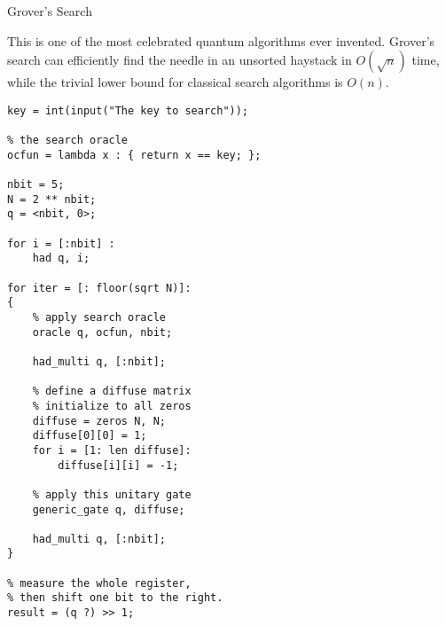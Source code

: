 \documentclass[]{article}
\begin{document}
Grover's Search

This is one of the most celebrated quantum algorithms ever invented.
Grover's search can efficiently find the needle in an unsorted haystack
in \(O(\sqrt{n})\) time, while the trivial lower bound for classical
search algorithms is \(O(n)\).

\begin{verbatim}
key = int(input("The key to search"));

% the search oracle
ocfun = lambda x : { return x == key; };

nbit = 5;
N = 2 ** nbit;
q = <nbit, 0>;

for i = [:nbit] :
    had q, i;

for iter = [: floor(sqrt N)]:
{
    % apply search oracle
    oracle q, ocfun, nbit;

    had_multi q, [:nbit];

    % define a diffuse matrix
    % initialize to all zeros
    diffuse = zeros N, N;
    diffuse[0][0] = 1;
    for i = [1: len diffuse]:
        diffuse[i][i] = -1;

    % apply this unitary gate
    generic_gate q, diffuse;

    had_multi q, [:nbit];
}

% measure the whole register, 
% then shift one bit to the right.
result = (q ?) >> 1;
\end{verbatim}
\end{document}

